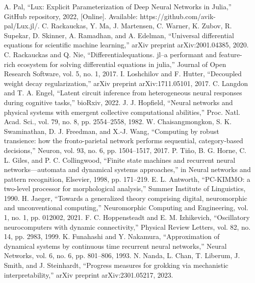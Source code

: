 \documentclass[conference]{IEEEtran}
\begin{document}
\begin{thebibliography}{00}
 A. Pal, ``Lux: Explicit Parameterization of Deep Neural Networks in Julia,'' GitHub repository, 2022, [Online]. Available: https://github.com/avik-pal/Lux.jl/.
 C. Rackauckas, Y. Ma, J. Martensen, C. Warner, K. Zubov, R. Supekar, D. Skinner, A. Ramadhan, and A. Edelman, ``Universal differential equations for scientific machine learning,'' arXiv preprint arXiv:2001.04385, 2020.
 C. Rackauckas and Q. Nie, ``Differentialequations. jl--a performant and feature-rich ecosystem for solving differential equations in julia,'' Journal of Open Research Software, vol. 5, no. 1, 2017.
 I. Loshchilov and F. Hutter, ``Decoupled weight decay regularization,'' arXiv preprint arXiv:1711.05101, 2017.
 C. Langdon and T. A. Engel, ``Latent circuit inference from heterogeneous neural responses during cognitive tasks,'' bioRxiv, 2022.
 J. J. Hopfield, ``Neural networks and physical systems with emergent collective computational abilities,'' Proc. Natl. Acad. Sci., vol. 79, no. 8, pp. 2554--2558, 1982.
 W. Chaisangmongkon, S. K. Swaminathan, D. J. Freedman, and X.-J. Wang, ``Computing by robust transience: how the fronto-parietal network performs sequential, category-based decisions,'' Neuron, vol. 93, no. 6, pp. 1504--1517, 2017.
 P. Ti\v{n}o, B. G. Horne, C. L. Giles, and P. C. Collingwood, ``Finite state machines and recurrent neural networks—automata and dynamical systems approaches,'' in Neural networks and pattern recognition, Elsevier, 1998, pp. 171--219.
 E. L. Antworth, ``PC-KIMMO: a two-level processor for morphological analysis,'' Summer Institute of Linguistics, 1990.
 H. Jaeger, ``Towards a generalized theory comprising digital, neuromorphic and unconventional computing,'' Neuromorphic Computing and Engineering, vol. 1, no. 1, pp. 012002, 2021.
 F. C. Hoppensteadt and E. M. Izhikevich, ``Oscillatory neurocomputers with dynamic connectivity,'' Physical Review Letters, vol. 82, no. 14, pp. 2983, 1999.
 K. Funahashi and Y. Nakamura, ``Approximation of dynamical systems by continuous time recurrent neural networks,'' Neural Networks, vol. 6, no. 6, pp. 801--806, 1993.
 N. Nanda, L. Chan, T. Liberum, J. Smith, and J. Steinhardt, ``Progress measures for grokking via mechanistic interpretability,'' arXiv preprint arXiv:2301.05217, 2023.
\end{thebibliography}
\vspace{12pt}
\end{document}
